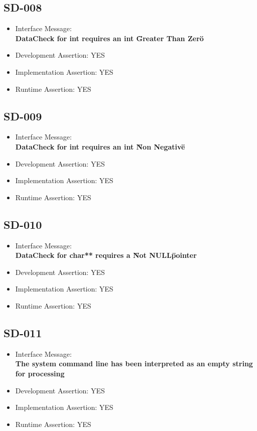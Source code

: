 \subsection{SD-008}
\begin{itemize}
  \item Interface Message:\\[1em]
    \textbf{DataCheck for int requires an int \"Greater Than Zero\"}
  \item Development Assertion: YES
  \item Implementation Assertion: YES
  \item Runtime Assertion: YES
\end{itemize}

\subsection{SD-009}
\begin{itemize}
  \item Interface Message:\\[1em]
    \textbf{DataCheck for int requires an int \"Non Negative\"}
  \item Development Assertion: YES
  \item Implementation Assertion: YES
  \item Runtime Assertion: YES
\end{itemize}

\subsection{SD-010}
\begin{itemize}
  \item Interface Message:\\[1em]
    \textbf{DataCheck for char** requires a \"Not NULL\" pointer}
  \item Development Assertion: YES
  \item Implementation Assertion: YES
  \item Runtime Assertion: YES
\end{itemize}

\subsection{SD-011}
\begin{itemize}
  \item Interface Message:\\[1em]
    \textbf{The system command line has been interpreted as an empty string for processing}
  \item Development Assertion: YES
  \item Implementation Assertion: YES
  \item Runtime Assertion: YES
\end{itemize}

